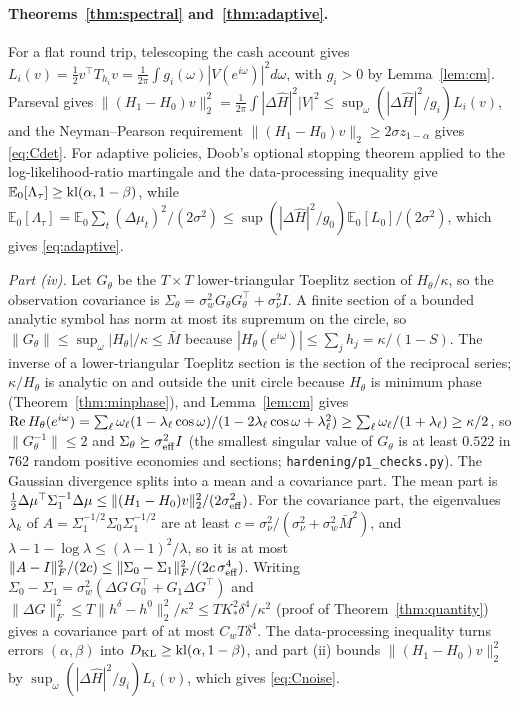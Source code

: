 \documentclass[12pt]{article}
\theoremstyle{definition}
\theoremstyle{remark}
\newcommand{\E}{\mathbb{E}}
\newcommand{\KL}{D_{\mathrm{KL}}}
\begin{document}
\paragraph{Theorems~\ref{thm:spectral} and~\ref{thm:adaptive}.} For a flat round trip, telescoping the cash account gives $L_i(v)=\tfrac12v^\top T_{h_i}v=\frac1{2\pi}\int g_i(\omega)|V(e^{i\omega})|^2d\omega$, with $g_i>0$ by Lemma~\ref{lem:cm}. Parseval gives $\|(H_1-H_0)v\|_2^2=\frac1{2\pi}\int|\Delta\hat H|^2|V|^2\le\sup_\omega(|\Delta\hat H|^2/g_i)L_i(v)$, and the Neyman--Pearson requirement $\|(H_1-H_0)v\|_2\ge2\sigma z_{1-\alpha}$ gives \eqref{eq:Cdet}. For adaptive policies, Doob's optional stopping theorem applied to the log-likelihood-ratio martingale and the data-processing inequality give $\E_0[\Lambda_\tau]\ge{\rm kl}(\alpha,1-\beta)$, while $\E_0[\Lambda_\tau]=\E_0\sum_t(\Delta\mu_t)^2/(2\sigma^2)\le\sup(|\Delta\hat H|^2/g_0)\E_0[L_0]/(2\sigma^2)$, which gives \eqref{eq:adaptive}.

\emph{Part (iv).} Let $G_\theta$ be the $T\times T$ lower-triangular Toeplitz section of $H_\theta/\kappa$, so the observation covariance is $\Sigma_\theta=\sigma_w^2G_\theta G_\theta^\top+\sigma_\nu^2I$. A finite section of a bounded analytic symbol has norm at most its supremum on the circle, so $\|G_\theta\|\le\sup_\omega|H_\theta|/\kappa\le\bar M$ because $|H_\theta(e^{i\omega})|\le\sum_jh_j=\kappa/(1-S)$. The inverse of a lower-triangular Toeplitz section is the section of the reciprocal series; $\kappa/H_\theta$ is analytic on and outside the unit circle because $H_\theta$ is minimum phase (Theorem~\ref{thm:minphase}), and Lemma~\ref{lem:cm} gives ${\rm Re}\,H_\theta(e^{i\omega})=\sum_\ell\omega_\ell(1-\lambda_\ell\cos\omega)/(1-2\lambda_\ell\cos\omega+\lambda_\ell^2)\ge\sum_\ell\omega_\ell/(1+\lambda_\ell)\ge\kappa/2$, so $\|G_\theta^{-1}\|\le2$ and $\Sigma_\theta\succeq\sigma_{\rm eff}^2I$ (the smallest singular value of $G_\theta$ is at least $0.522$ in 762 random positive economies and sections; \texttt{hardening/p1\_checks.py}). The Gaussian divergence splits into a mean and a covariance part. The mean part is $\tfrac12\Delta\mu^\top\Sigma_1^{-1}\Delta\mu\le\|(H_1-H_0)v\|_2^2/(2\sigma_{\rm eff}^2)$. For the covariance part, the eigenvalues $\lambda_k$ of $A=\Sigma_1^{-1/2}\Sigma_0\Sigma_1^{-1/2}$ are at least $c=\sigma_\nu^2/(\sigma_\nu^2+\sigma_w^2\bar M^2)$, and $\lambda-1-\log\lambda\le(\lambda-1)^2/\lambda$, so it is at most $\|A-I\|_F^2/(2c)\le\|\Sigma_0-\Sigma_1\|_F^2/(2c\,\sigma_{\rm eff}^4)$. Writing $\Sigma_0-\Sigma_1=\sigma_w^2(\Delta G\,G_0^\top+G_1\Delta G^\top)$ and $\|\Delta G\|_F^2\le T\|h^\delta-h^0\|_2^2/\kappa^2\le TK_*^2\delta^4/\kappa^2$ (proof of Theorem~\ref{thm:quantity}) gives a covariance part of at most $C_wT\delta^4$. The data-processing inequality turns errors $(\alpha,\beta)$ into $\KL\ge{\rm kl}(\alpha,1-\beta)$, and part (ii) bounds $\|(H_1-H_0)v\|_2^2$ by $\sup_\omega(|\Delta\hat H|^2/g_i)L_i(v)$, which gives \eqref{eq:Cnoise}.
\end{document}
